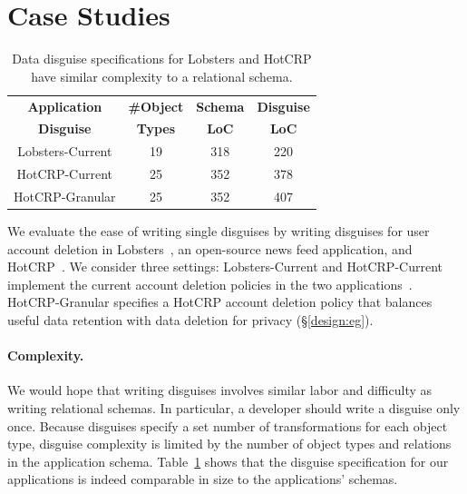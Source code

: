 \section{Case Studies}
\label{sec:hotcrp_example}

\begin{table}[t!]
    \centering
    \footnotesize
    \begin{tabular}{@{}cccc@{}}
        \textbf{Application} & \textbf{\#Object} & \textbf{Schema} &
        \textbf{Disguise} \\
        \textbf{Disguise} & \textbf{Types} & \textbf{LoC} & \textbf{LoC} \\
    \midrule
    Lobsters-Current & 19 & 318 & 220 \\
    HotCRP-Current & 25 & 352 & 378 \\
    HotCRP-Granular & 25 & 352 & 407 \\
\end{tabular}
    \caption{Data disguise specifications for Lobsters and HotCRP have similar complexity to
    a relational schema.
    }
\label{tab:loc}
\end{table}

%
We evaluate the ease of writing single disguises by writing disguises for user account deletion in
Lobsters~\cite{lobsters}, an open-source news feed application, and HotCRP~\cite{hotcrp}.
%
We consider three settings: Lobsters-Current and HotCRP-Current implement the current account
deletion policies in the two applications~\cite{lobsters:privacy, hotcrp:privacy}.
%
HotCRP-Granular specifies a HotCRP account deletion policy that balances useful data retention with
data deletion for privacy (\S\ref{design:eg}).
%

\paragraph{Complexity.}
%
We would hope that writing disguises involves similar labor and difficulty as writing
relational schemas.
%
In particular, a developer should write a disguise only once.
%
Because disguises specify a set number of transformations for each object type,
disguise complexity is limited by the number of object types and relations in the
application schema.
%
Table~\ref{tab:loc} shows that the disguise specification for our applications is indeed
comparable in size to the applications' schemas.
%

